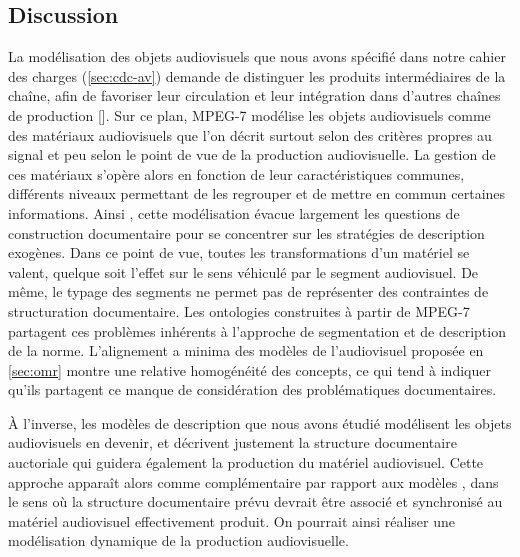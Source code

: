 \subsection*{Discussion}
La modélisation des objets audiovisuels que nous avons spécifié dans notre cahier des charges (\ref{sec:cdc-av}) demande de distinguer les produits intermédiaires de la chaîne, afin de favoriser leur circulation et leur intégration dans d'autres chaînes de production [].
Sur ce plan, MPEG-7 modélise les objets audiovisuels comme des matériaux audiovisuels que l'on décrit surtout selon des critères propres au signal et peu selon le point de vue de la production audiovisuelle.
La gestion de ces matériaux s'opère alors en fonction de leur caractéristiques communes, différents niveaux permettant de les regrouper et de mettre en commun certaines informations. 
Ainsi , cette modélisation évacue largement les questions de construction documentaire pour se concentrer sur les stratégies de description exogènes.
Dans ce point de vue, toutes les transformations d'un matériel se valent, quelque soit l'effet sur le sens véhiculé par le segment audiovisuel. 
De même, le typage des segments ne permet pas de représenter des contraintes de structuration documentaire.
Les ontologies construites à partir de MPEG-7 partagent ces problèmes inhérents à l'approche de segmentation et de description de la norme.
L'alignement a minima des modèles de l'audiovisuel proposée en \ref{sec:omr} montre une relative homogénéité des concepts, ce qui tend à indiquer qu'ils partagent  ce manque de considération des problématiques documentaires. 

À l'inverse, les modèles de description  que nous avons étudié modélisent les objets audiovisuels en devenir, et décrivent justement la structure documentaire auctoriale qui guidera également la production du matériel audiovisuel.
Cette approche apparaît alors comme complémentaire par rapport aux modèles , dans le sens où la structure documentaire prévu devrait être associé et synchronisé au matériel audiovisuel effectivement produit.
On pourrait ainsi réaliser une modélisation dynamique de la production audiovisuelle.\\


